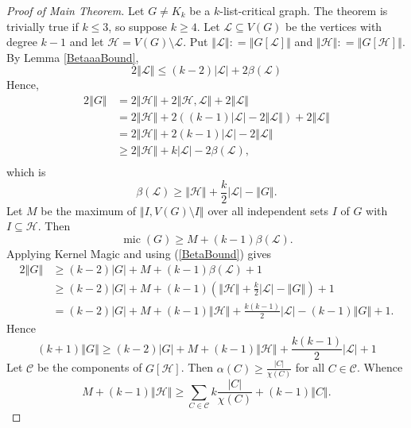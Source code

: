 \documentclass[12pt]{article}
\theoremstyle{plain}
\theoremstyle{definition}
\theoremstyle{remark}
\newcommand{\fancy}[1]{\mathcal{#1}}
\newcommand{\C}[1]{\fancy{C}_{#1}}
\renewcommand{\L}{\fancy{L}}
\newcommand{\HH}{\fancy{H}}
\newcommand{\card}[1]{\left|#1\right|}
\newcommand{\size}[1]{\left\Vert#1\right\Vert}
\newcommand{\parens}[1]{\left( #1 \right)}
\newcommand{\DefinedAs}{\mathrel{\mathop:}=}
\newcommand{\mic}{\operatorname{mic}}
\def\C{\fancy{C}}
\begin{document}
\begin{proof}[Proof of Main Theorem]
Let $G \ne K_k$ be a $k$-list-critical graph.  The theorem is trivially true if $k \le 3$, so suppose $k \ge 4$. Let $\L \subseteq V(G)$ be the vertices with degree $k-1$ and let $\HH = V(G) \setminus \L$.  Put $\size{\L} \DefinedAs \size{G[\L]}$ and $\size{\HH} \DefinedAs \size{G[\HH]}$.  
By Lemma \ref{BetaaaBound},
	\begin{equation*}
	2\size{\L} \le (k-2)|\L| + 2\beta(\L)
	\end{equation*}
	Hence,
	\begin{align*}
	2\size{G} &= 2\size{\HH} + 2\size{\HH, \L} + 2\size{\L}\\
	&= 2\size{\HH} + 2((k-1)\card{\L} - 2\size{\L}) + 2\size{\L}\\
	&= 2\size{\HH} + 2(k-1)\card{\L} - 2\size{\L}\\
	&\ge 2\size{\HH} + k\card{\L} - 2\beta(\L),\\
	\end{align*}
	which is
	\begin{equation}
	\beta(\L) \ge \size{\HH} + \frac{k}{2}\card{\L} - \size{G}.
	\label{BetaBound}
	\end{equation}
	Let $M$ be the maximum of $\size{I, V(G) \setminus I}$ over all independent sets $I$ of $G$ with $I \subseteq \HH$. Then
	\begin{equation*}
		\mic(G) \ge M + (k-1)\beta(\L).
	\end{equation*}
	Applying Kernel Magic and using (\ref{BetaBound}) gives
	\begin{align*}
	2\size{G} &\ge (k-2)\card{G} + M + (k-1)\beta(\L) + 1\\
	&\ge (k-2)\card{G} + M + (k-1)\parens{\size{\HH} + \frac{k}{2}\card{\L} - \size{G}} + 1\\
	&= (k-2)\card{G} + M + (k-1)\size{\HH} + \frac{k(k-1)}{2}\card{\L} - (k-1)\size{G} + 1.
	\end{align*}		
	Hence
	\begin{equation}
	(k+1)\size{G} \ge (k-2)\card{G} + M + (k-1)\size{\HH} + \frac{k(k-1)}{2}\card{\L} + 1
	\label{KPOBound}
	\end{equation}
	Let $\C$ be the components of $G[\HH]$.  Then $\alpha(C) \ge \frac{\card{C}}{\chi(C)}$ for all $C \in \C$.  Whence
	\begin{equation}
	  M + (k-1)\size{\HH} \ge \sum_{C \in \C} k\frac{\card{C}}{\chi(C)} + (k-1)\size{C}.
	  \label{Mbound}
	\end{equation}
	

\end{proof}
\end{document}
